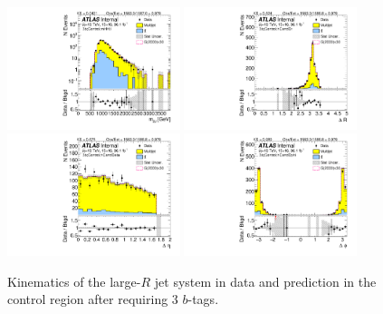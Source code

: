 \begin{figure}[htbp!]
\begin{center}
\includegraphics[width=0.45\textwidth,angle=-90]{figures/boosted/Control/b77_ThreeTag_Control_mHH_l_1.pdf}
\includegraphics[width=0.45\textwidth,angle=-90]{figures/boosted/Control/b77_ThreeTag_Control_hCandDr.pdf}\\
\includegraphics[width=0.45\textwidth,angle=-90]{figures/boosted/Control/b77_ThreeTag_Control_hCandDeta.pdf}
\includegraphics[width=0.45\textwidth,angle=-90]{figures/boosted/Control/b77_ThreeTag_Control_hCandDphi.pdf}
  \caption{Kinematics of the large-$R$ jet system in data and prediction in the control region after requiring 3 $b$-tags.  }
  \label{fig:boosted-3b-control-ak10-system}
\end{center}
\end{figure}


